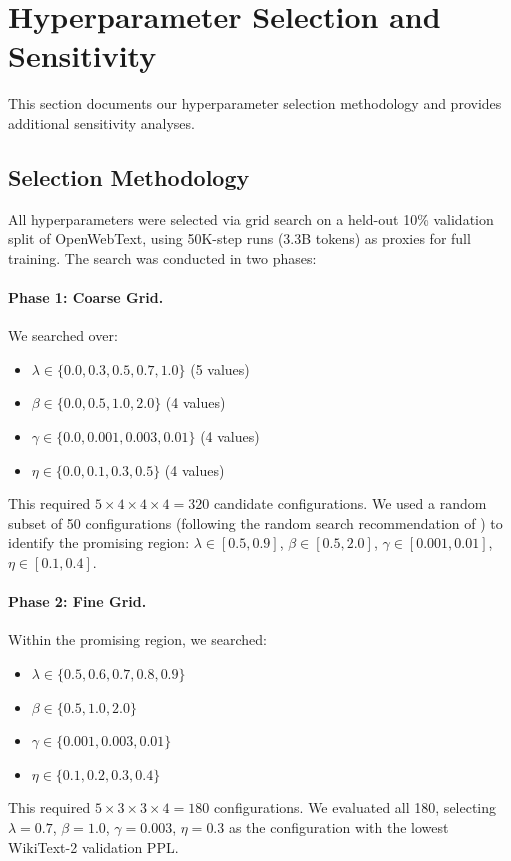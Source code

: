 \section{Hyperparameter Selection and Sensitivity}
\label{app:hyperparameter}

This section documents our hyperparameter selection methodology and provides additional sensitivity analyses.

\subsection{Selection Methodology}

All hyperparameters were selected via grid search on a held-out 10\% validation split of OpenWebText, using 50K-step runs (3.3B tokens) as proxies for full training. The search was conducted in two phases:

\paragraph{Phase 1: Coarse Grid.} We searched over:
\begin{itemize}[leftmargin=*,itemsep=1pt]
    \item $\lambda \in \{0.0, 0.3, 0.5, 0.7, 1.0\}$ (5 values)
    \item $\beta \in \{0.0, 0.5, 1.0, 2.0\}$ (4 values)
    \item $\gamma \in \{0.0, 0.001, 0.003, 0.01\}$ (4 values)
    \item $\eta \in \{0.0, 0.1, 0.3, 0.5\}$ (4 values)
\end{itemize}
This required $5 \times 4 \times 4 \times 4 = 320$ candidate configurations. We used a random subset of 50 configurations (following the random search recommendation of \citet{bergstra2012random}) to identify the promising region: $\lambda \in [0.5, 0.9]$, $\beta \in [0.5, 2.0]$, $\gamma \in [0.001, 0.01]$, $\eta \in [0.1, 0.4]$.

\paragraph{Phase 2: Fine Grid.} Within the promising region, we searched:
\begin{itemize}[leftmargin=*,itemsep=1pt]
    \item $\lambda \in \{0.5, 0.6, 0.7, 0.8, 0.9\}$
    \item $\beta \in \{0.5, 1.0, 2.0\}$
    \item $\gamma \in \{0.001, 0.003, 0.01\}$
    \item $\eta \in \{0.1, 0.2, 0.3, 0.4\}$
\end{itemize}
This required $5 \times 3 \times 3 \times 4 = 180$ configurations. We evaluated all 180, selecting $\lambda = 0.7$, $\beta = 1.0$, $\gamma = 0.003$, $\eta = 0.3$ as the configuration with the lowest WikiText-2 validation PPL.

